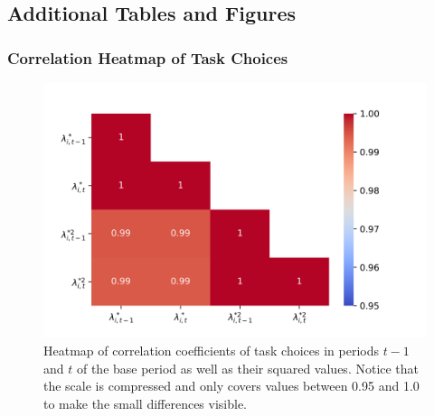\documentclass[../main.tex]{subfiles}
\begin{document}
\subsection{Additional Tables and Figures} \label{app:tables_and_figures}
\subsubsection{Correlation Heatmap of Task Choices}
\begin{figure}[!htbp]
	\centering
	\includegraphics[scale=0.7]{./FIG/corr_heatmap.png} 
	\caption{Heatmap of correlation coefficients of task choices in periods $t-1$ and $t$ of the base period as well as their squared values. Notice that the scale is compressed and only covers values between 0.95 and 1.0 to make the small differences visible.}
	\label{fig:corr_heatmap}
\end{figure}

\FloatBarrier
\end{document}
